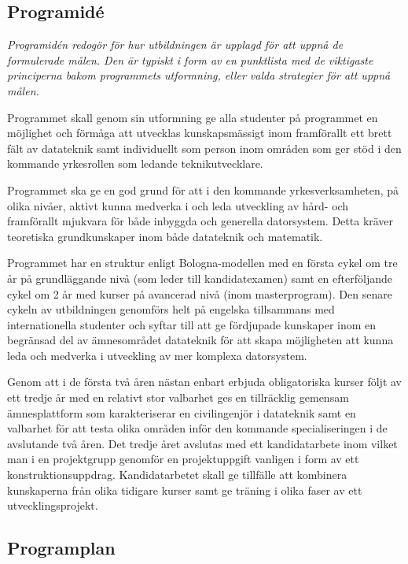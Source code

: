 \documentclass[twocolumn]{article}
\newcommand{\meta}[1]{{\small \emph{#1}}}
\begin{document}
\subsection{Programidé}
\meta{Programidén redogör för hur utbildningen är upplagd för att
  uppnå de formulerade målen. Den är typiskt i form av en punktlista
  med de viktigaste principerna bakom programmets utformning, eller
  valda strategier för att uppnå målen.}

Programmet skall genom sin utformning ge alla studenter på programmet
en möjlighet och förmåga att utvecklas kunskapsmässigt inom
framförallt ett brett fält av datateknik samt individuellt som person
inom områden som ger stöd i den kommande yrkesrollen som ledande
teknikutvecklare.

Programmet ska ge en god grund för att i den kommande
yrkesverksamheten, på olika nivåer, aktivt kunna medverka i och leda
utveckling av hård- och framförallt mjukvara för både inbyggda och
generella datorsystem. Detta kräver teoretiska grundkunskaper inom
både datateknik och matematik.

Programmet har en struktur enligt Bologna-modellen med en första cykel
om tre år på grundläggande nivå (som leder till kandidatexamen) samt
en efterföljande cykel om 2 år med kurser på avancerad nivå (inom
masterprogram). Den senare cykeln av utbildningen genomförs helt på
engelska tillsammans med internationella studenter och syftar till att
ge fördjupade kunskaper inom en begränsad del av ämnesområdet
datateknik för att skapa möjligheten att kunna leda och medverka i
utveckling av mer komplexa datorsystem.

Genom att i de första två åren nästan enbart erbjuda obligatoriska
kurser följt av ett tredje år med en relativt stor valbarhet ges en
tillräcklig gemensam ämnesplattform som karakteriserar en
civilingenjör i datateknik samt en valbarhet för att testa olika
områden inför den kommande specialiseringen i de avslutande två åren.
Det tredje året avslutas med ett kandidatarbete inom vilket man i en
projektgrupp genomför en projektuppgift vanligen i form av ett
konstruktionsuppdrag. Kandidatarbetet skall ge tillfälle att kombinera
kunskaperna från olika tidigare kurser samt ge träning i olika faser
av ett utvecklingsprojekt.

\subsection{Programplan}
\end{document}
